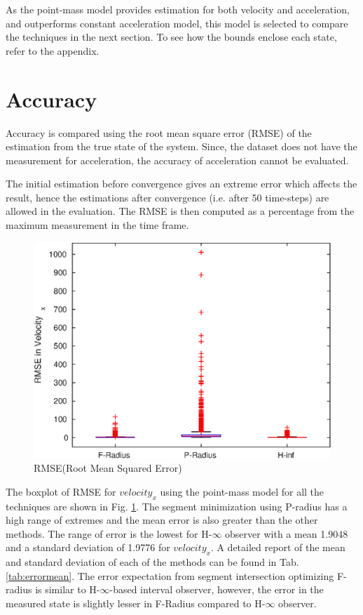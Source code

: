 As the point-mass model provides estimation for both velocity and acceleration, and outperforms constant acceleration model, this model is selected to compare the techniques in the next section. To see how the bounds enclose each state, refer to the appendix.

\section{Accuracy}
Accuracy is compared using the root mean square error (RMSE) of the estimation from the true state of the system. Since, the dataset does not have the measurement for acceleration, the accuracy of acceleration cannot be evaluated.

The initial estimation before convergence gives an extreme error which affects the result, hence the estimations after convergence (i.e. after 50 time-steps) are allowed in the evaluation. The RMSE is then computed as a percentage from the maximum measurement in the time frame.

\begin{figure}[h]
\centering
\includegraphics[width=\linewidth]{figures/Error/boxplotall}
\caption{RMSE(Root Mean Squared Error)}
\label{fig:boxplot}
\end{figure}

The boxplot of RMSE for $velocity_x$ using the point-mass model for all the techniques are shown in Fig. \ref{fig:boxplot}. The segment minimization using P-radius has a high range of extremes and the mean error is also greater than the other methods. The range of error is the lowest for H-$\infty$ observer with a mean 
1.9048 and a standard deviation of 1.9776 for $velocity_x$. A detailed report of the mean and standard deviation of each of the methods can be found in Tab. \ref{tab:errormean}. The error expectation from segment intersection optimizing F-radius is similar to H-$\infty$-based interval observer, however, the error in the measured state is slightly lesser in F-Radius compared to H-$\infty$ observer.


